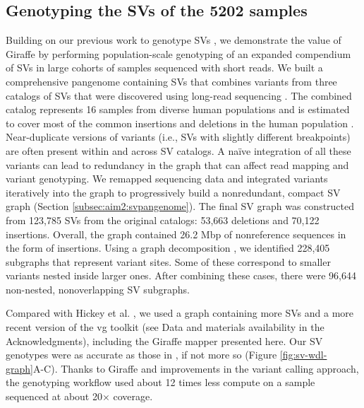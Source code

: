 \documentclass[11pt]{ucscthesis}
\begin{document}
\subsection{Genotyping the SVs of the 5202 samples}
Building on our previous work to genotype SVs \cite{hickey_vgsv_2020}, we demonstrate the value of Giraffe by performing population-scale genotyping of an expanded compendium of SVs in large cohorts of samples sequenced with short reads.
We built a comprehensive pangenome containing SVs that combines variants from three catalogs of SVs that were discovered using long-read sequencing \cite{zook_robust_2020,chaisson_sv_2019,audano_hgsvc}.
The combined catalog represents 16 samples from diverse human populations and is estimated to cover most of the common insertions and deletions in the human population \cite{audano_hgsvc}.
Near-duplicate versions of variants (i.e., SVs with slightly different breakpoints) are often present within and across SV catalogs.
A naïve integration of all these variants can lead to redundancy in the graph that can affect read mapping and variant genotyping.
We remapped sequencing data and integrated variants iteratively into the graph to progressively build a nonredundant, compact SV graph (Section \ref{subsec:aim2:svpangenome}).
The final SV graph was constructed from 123,785 SVs from the original catalogs: 53,663 deletions and 70,122 insertions.
Overall, the graph contained 26.2 Mbp of nonreference sequences in the form of insertions. Using a graph decomposition \cite{paten_superbubbles_2018}, we identified 228,405 subgraphs that represent variant sites.
Some of these correspond to smaller variants nested inside larger ones. After combining these cases, there were 96,644 non-nested, nonoverlapping SV subgraphs.

Compared with Hickey et al. \cite{hickey_vgsv_2020}, we used a graph containing more SVs and a more recent version of the vg toolkit (see Data and materials availability in the Acknowledgments), including the Giraffe mapper presented here. Our SV genotypes were as accurate as those in \cite{hickey_vgsv_2020}, if not more so (Figure \ref{fig:sv-wdl-graph}A-C).
Thanks to Giraffe and improvements in the variant calling approach, the genotyping workflow used about 12 times less compute on a sample sequenced at about 20× coverage.
\end{document}
